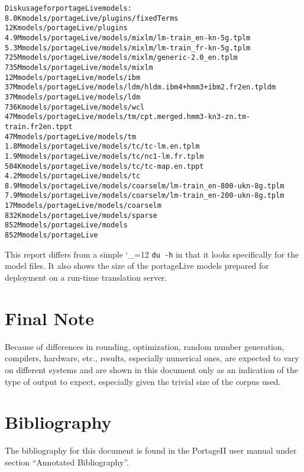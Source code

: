 \documentclass[11pt,letterpaper]{article}
\newcommand{\PS}{PortageII\xspace}
\def\code{\begingroup\catcode`\_=12 \codex}
\newcommand{\codex}[1]{\texttt{#1}\endgroup}
\begin{document}
\begin{small}
\begin{alltt}
   Disk usage for portageLive models:
   8.0K    models/portageLive/plugins/fixedTerms
   12K     models/portageLive/plugins
   4.9M    models/portageLive/models/mixlm/lm-train_en-kn-5g.tplm
   5.3M    models/portageLive/models/mixlm/lm-train_fr-kn-5g.tplm
   725M    models/portageLive/models/mixlm/generic-2.0_en.tplm
   735M    models/portageLive/models/mixlm
   12M     models/portageLive/models/ibm
   37M     models/portageLive/models/ldm/hldm.ibm4+hmm3+ibm2.fr2en.tpldm
   37M     models/portageLive/models/ldm
   736K    models/portageLive/models/wcl
   47M     models/portageLive/models/tm/cpt.merged.hmm3-kn3-zn.tm-train.fr2en.tppt
   47M     models/portageLive/models/tm
   1.8M    models/portageLive/models/tc/tc-lm.en.tplm
   1.9M    models/portageLive/models/tc/nc1-lm.fr.tplm
   504K    models/portageLive/models/tc/tc-map.en.tppt
   4.2M    models/portageLive/models/tc
   8.9M    models/portageLive/models/coarselm/lm-train_en-800-ukn-8g.tplm
   7.9M    models/portageLive/models/coarselm/lm-train_en-200-ukn-8g.tplm
   17M     models/portageLive/models/coarselm
   832K    models/portageLive/models/sparse
   852M    models/portageLive/models
   852M    models/portageLive
\end{alltt}
\end{small}

This report differs from a simple \code{du -h} in that it looks specifically
for the model files. It also shows the size of the portageLive models prepared
for deployment on a run-time translation server.

\section*{Final Note}
Because of differences in rounding, optimization, random number generation,
compilers, hardware, etc., results, especially numerical ones, are expected to
vary on different systems and are shown in this document only as an indication
of the type of output to expect, especially given the trivial size of the
corpus used.

\section*{Bibliography}
The bibliography for this document is found in the \PS user manual under
section ``Annotated Bibliography''.
\end{document}
